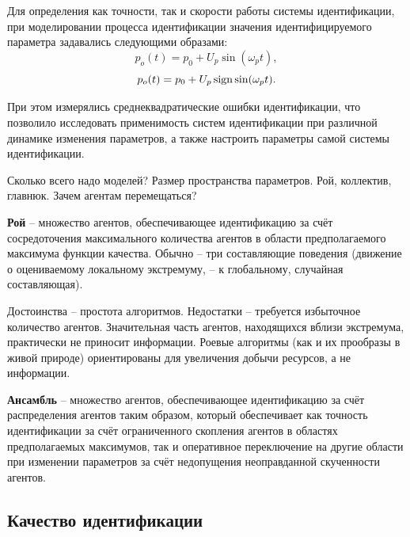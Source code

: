 Для определения как точности, так и скорости работы системы
идентификации, при моделировании процесса идентификации
значения идентифицируемого параметра задавались следующими образами:
%
\begin{equation}
  p_o(t) = p_0 +  U_{p} \sin( \omega_{p} t ),
  \label{atu:eq:p_sin}
\end{equation}
%
\begin{equation}
  p_o(t) = p_0 + U_{p} \operatorname*{sign} \sin( \omega_{p} t ).
  \label{atu:eq:p_sign}
\end{equation}

При этом измерялись среднеквадратические ошибки идентификации,
что позволило исследовать применимость систем идентификации
при различной динамике изменения параметров, а также
настроить параметры самой системы идентификации.

Сколько всего надо моделей? Размер пространства параметров.
Рой, коллектив, главнюк.
Зачем агентам перемещаться?


\textbf{ Рой } -- множество агентов, обеспечивающее идентификацию за счёт
сосредоточения максимального количества агентов
в области предполагаемого максимума функции качества.
Обычно -- три составляющие поведения
(движение о оцениваемому локальному экстремуму, -- к глобальному, случайная составляющая).


Достоинства -- простота алгоритмов.
Недостатки -- требуется избыточное количество агентов.
Значительная часть агентов, находящихся вблизи экстремума,
практически не приносит информации. Роевые
алгоритмы (как и их прообразы в живой природе) ориентированы
для увеличения добычи ресурсов, а не информации.

\textbf{ Ансамбль } -- множество агентов, обеспечивающее идентификацию за счёт
распределения агентов таким образом, который обеспечивает как
точность идентификации за счёт ограниченного скопления агентов
в областях предполагаемых максимумов, так и оперативное переключение
на другие области при изменении параметров за счёт недопущения
неоправданной скученности агентов.




\subsection{Качество идентификации}

